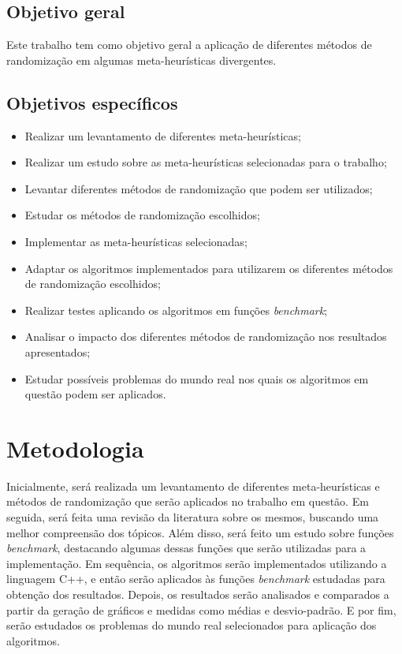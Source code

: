\documentclass[11pt]{article}
\begin{document}
\subsection{Objetivo geral}
\label{objgeral}

Este trabalho tem como objetivo geral a aplicação de diferentes métodos de randomização em algumas meta-heurísticas divergentes.

\subsection{Objetivos específicos}
\label{objesp}

\begin{itemize}
    \item Realizar um levantamento de diferentes meta-heurísticas;
    \item Realizar um estudo sobre as meta-heurísticas selecionadas para o trabalho;
    \item Levantar diferentes métodos de randomização que podem ser utilizados;
    \item Estudar os métodos de randomização escolhidos;
    \item Implementar as meta-heurísticas selecionadas;
    \item Adaptar os algoritmos implementados para utilizarem os diferentes métodos de randomização escolhidos;
    \item Realizar testes aplicando os algoritmos em funções \textit{benchmark};
    \item Analisar o impacto dos diferentes métodos de randomização nos resultados apresentados;
    \item Estudar possíveis problemas do mundo real nos quais os algoritmos em questão podem ser aplicados.
\end{itemize}


\section{Metodologia}
\label{met}

Inicialmente, será realizada um levantamento de diferentes meta-heurísticas e métodos de randomização que serão aplicados no trabalho em questão. Em seguida, será feita uma revisão da literatura sobre os mesmos, buscando uma melhor compreensão dos tópicos. Além disso, será feito um estudo sobre funções \textit{benchmark}, destacando algumas dessas funções que serão utilizadas para a implementação. Em sequência, os algoritmos serão implementados utilizando a linguagem C++, e então serão aplicados às funções \textit{benchmark} estudadas para obtenção dos resultados. Depois, os resultados serão analisados e comparados a partir da geração de gráficos e medidas como médias e desvio-padrão. E por fim, serão estudados os problemas do mundo real selecionados para aplicação dos algoritmos.
\end{document}
